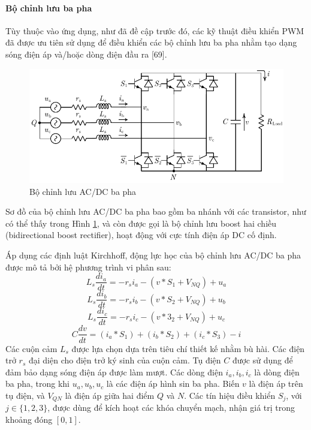 \paragraph{Bộ chỉnh lưu ba pha}
Tùy thuộc vào ứng dụng, như đã đề cập trước đó, các kỹ thuật điều khiển PWM đã được ưu tiên sử dụng để điều khiển các bộ chỉnh lưu ba pha nhằm tạo dạng sóng điện áp và/hoặc dòng điện đầu ra [69]. \par
\begin{figure}
    \centering
    \includegraphics[width= \textwidth]{Figures/Content_Pages/Chapter_2/C2_4.pdf}
    \caption{Bộ chỉnh lưu AC/DC ba pha}
    \label{fig:C2_4}
\end{figure}
Sơ đồ của bộ chỉnh lưu AC/DC ba pha bao gồm ba nhánh với các transistor, như có thể thấy trong Hình \ref{fig:C2_4}, và còn được gọi là bộ chỉnh lưu boost hai chiều (bidirectional boost rectifier), hoạt động với cực tính điện áp DC cố định.\par
Áp dụng các định luật Kirchhoff, động lực học của bộ chỉnh lưu AC/DC ba pha được mô tả bởi hệ phương trình vi phân sau:
\begin{equation} \label{E2_5}
    L_s \frac{di_a}{dt} = -r_si_a - (v*S_1+V_{NQ}) + u_a
\end{equation}
\begin{equation} \label{E2_6}
    L_s \frac{di_b}{dt} = -r_si_b - (v*S_2+V_{NQ}) + u_b
\end{equation}
\begin{equation} \label{E2_7}
    L_s \frac{di_c}{dt} = -r_si_c - (v*3_2+V_{NQ}) + u_c
\end{equation}
\begin{equation} \label{E2_8}
    C \frac{dv}{dt} = (i_a *S_1) + (i_b*S_2) + (i_c *S_3) - i
\end{equation}
\noindent Các cuộn cảm \( L_s \) được lựa chọn dựa trên tiêu chí thiết kế nhằm bù hài. Các điện trở \( r_s \) đại diện cho điện trở ký sinh của cuộn cảm. Tụ điện \( C \) được sử dụng để đảm bảo dạng sóng điện áp được làm mượt. Các dòng điện \( i_a, i_b, i_c \) là dòng điện ba pha, trong khi \( u_a, u_b, u_c \) là các điện áp hình sin ba pha. Biến \( v \) là điện áp trên tụ điện, và \( V_{QN} \) là điện áp giữa hai điểm \( Q \) và \( N \). Các tín hiệu điều khiển \( S_j \), với \( j \in \{1, 2, 3\} \), được dùng để kích hoạt các khóa chuyển mạch, nhận giá trị trong khoảng đóng \([0, 1]\). \par
